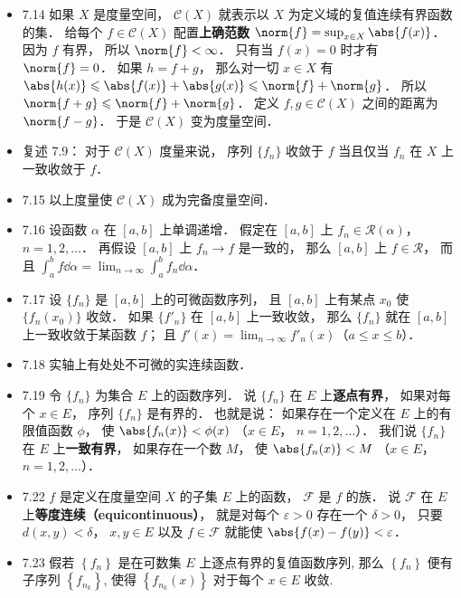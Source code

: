 \begin{itemize}
\item 7.14 如果 $X$ 是度量空间， $\mathscr C(X)$ 就表示以 $X$ 为定义域的复值连续有界函数的集． 给每个 $f\in\mathscr C(X)$ 配置\textbf{上确范数} $\norm{f} = \sup_{x\in X} \abs{f(x)}$． 因为 $f$ 有界， 所以 $\norm{f}<\infty$． 只有当 $f(x)=0$ 时才有 $\norm{f}=0$． 如果 $h=f+g$， 那么对一切 $x\in X$ 有 $\abs{h(x)}\leqslant \abs{f(x)} + \abs{g(x)}\leqslant \norm{f}+\norm{g}$． 所以 $\norm{f+g}\leqslant \norm{f}+\norm{g}$． 定义 $f,g\in\mathscr C(X)$ 之间的距离为 $\norm{f-g}$． 于是 $\mathscr C(X)$ 变为度量空间．

\item 复述 7.9： 对于 $\mathscr C(X)$ 度量来说， 序列 $\{f_n\}$ 收敛于 $f$ 当且仅当 $f_n$ 在 $X$ 上一致收敛于 $f$．

\item 7.15 以上度量使 $\mathscr C(X)$ 成为完备度量空间．

\item 7.16 设函数 $\alpha$ 在 $[a,b]$ 上单调递增． 假定在 $[a,b]$ 上 $f_n\in\mathscr R(\alpha)$， $n=1,2,\dots$． 再假设 $[a,b]$ 上 $f_n\to f$ 是一致的， 那么 $[a,b]$ 上 $f\in\mathscr R$， 而且 $\int_a^b f\dd{\alpha} = \lim_{n\to\infty}\int_a^b f_n\dd{\alpha}$．

\item 7.17 设 $\{f_n\}$ 是 $[a,b]$ 上的可微函数序列， 且 $[a,b]$ 上有某点 $x_0$ 使 $\{f_n(x_0)\}$ 收敛． 如果 $\{f'_n\}$ 在 $[a,b]$ 上一致收敛， 那么 $\{f_n\}$ 就在 $[a,b]$ 上一致收敛于某函数 $f$； 且 $f'(x) = \lim_{n\to\infty} f'_n(x)$（$a\leqslant x \leqslant b$）．

\item 7.18 实轴上有处处不可微的实连续函数．

\item 7.19 令 $\{f_n\}$ 为集合 $E$ 上的函数序列． 说 $\{f_n\}$ 在 $E$ 上\textbf{逐点有界}， 如果对每个 $x\in E$， 序列 $\{f_n\}$ 是有界的． 也就是说： 如果存在一个定义在 $E$ 上的有限值函数 $\phi$， 使 $\abs{f_n(x)}<\phi(x)$ （$x\in E$， $n=1,2,\dots$）． 我们说 $\{f_n\}$ 在 $E$ 上\textbf{一致有界}， 如果存在一个数 $M$， 使 $\abs{f_n(x)}<M$ （$x\in E$， $n=1,2,\dots$）．

\item 7.22 $f$ 是定义在度量空间 $X$ 的子集 $E$ 上的函数， $\mathscr F$ 是 $f$ 的族． 说 $\mathscr F$ 在 $E$ 上\textbf{等度连续（equicontinuous）}， 就是对每个 $\varepsilon>0$ 存在一个 $\delta >0$， 只要 $d(x,y)<\delta$， $x,y\in E$ 以及 $f\in \mathscr F$ 就能使 $\abs{f(x)-f(y)}<\varepsilon$．

\item 7.23 假若 $\left\{f_{n}\right\}$ 是在可数集 $E$ 上逐点有界的复值函数序列, 那么 $\left\{f_{n}\right\}$ 便有子序列 $\left\{f_{n_{k}}\right\}$, 使得 $\left\{f_{n_{k}}(x)\right\}$ 对于每个 $x \in E$ 收敛.


\end{itemize}
